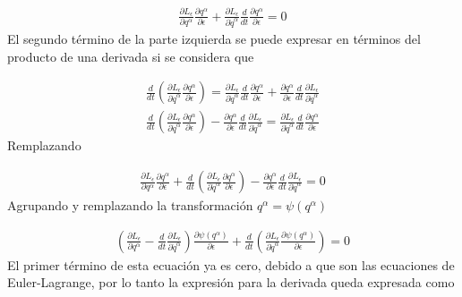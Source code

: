 \begin{gather*}
    \frac{\partial L_\epsilon}{\partial q^{\alpha}}\frac{\partial q^{\alpha}}{\partial \epsilon} + \frac{\partial L_\epsilon}{\partial \dot{q}^{\alpha}}\frac{d}{dt}\frac{\partial q^{\alpha}}{\partial \epsilon}  = 0
\end{gather*}
El segundo término de la parte izquierda se puede expresar en términos del producto de una derivada si se considera que 

\begin{gather*}
    \frac{d}{dt}\left(\frac{\partial L_\epsilon}{\partial \dot{q}^{\alpha}}\frac{\partial q^{\alpha}}{\partial \epsilon}\right) = \frac{\partial L_\epsilon}{\partial \dot{q}^{\alpha}}\frac{d}{dt}\frac{\partial q^{\alpha}}{\partial \epsilon} + \frac{\partial q^{\alpha}}{\partial \epsilon}\frac{d}{dt}\frac{\partial L_\epsilon}{\partial \dot{q}^{\alpha}}\\
    \frac{d}{dt}\left(\frac{\partial L_\epsilon}{\partial \dot{q}^{\alpha}}\frac{\partial q^{\alpha}}{\partial \epsilon}\right) - \frac{\partial q^{\alpha}}{\partial \epsilon}\frac{d}{dt}\frac{\partial L_\epsilon}{\partial \dot{q}^{\alpha}} = \frac{\partial L_\epsilon}{\partial \dot{q}^{\alpha}}\frac{d}{dt}\frac{\partial q^{\alpha}}{\partial \epsilon}
\end{gather*}
Remplazando 

\begin{gather*}
    \frac{\partial L_\epsilon}{\partial q^{\alpha}}\frac{\partial q^{\alpha}}{\partial \epsilon} + \frac{d}{dt}\left(\frac{\partial L_\epsilon}{\partial \dot{q}^{\alpha}}\frac{\partial q^{\alpha}}{\partial \epsilon}\right) - \frac{\partial q^{\alpha}}{\partial \epsilon}\frac{d}{dt}\frac{\partial L_\epsilon}{\partial \dot{q}^{\alpha}} = 0
\end{gather*}
Agrupando y remplazando la transformación $q^{\alpha} = \psi(q^{\alpha})$

\begin{gather*}
    \left(\frac{\partial L_\epsilon}{\partial q^{\alpha}} - \frac{d}{dt}\frac{\partial L_\epsilon}{\partial \dot{q}^{\alpha}} \right) \frac{\partial \psi(q^{\alpha})}{\partial \epsilon} + \frac{d}{dt}\left(\frac{\partial L_\epsilon}{\partial \dot{q}^{\alpha}}\frac{\partial \psi(q^{\alpha})}{\partial \epsilon}\right)   = 0
\end{gather*}
El primer término de esta ecuación ya es cero, debido a que son las ecuaciones de Euler-Lagrange, por lo tanto la expresión para la derivada queda expresada como

